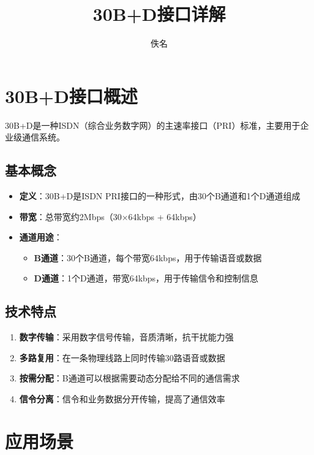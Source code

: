 \documentclass[12pt,UTF8]{ctexbook}
\title{\heiti\zihao{0} 30B+D接口详解}
\author{佚名}
\date{}
\begin{document}
\maketitle
\tableofcontents

\frontmatter

\mainmatter

\chapter{30B+D接口概述}

30B+D是一种ISDN（综合业务数字网）的主速率接口（PRI）标准，主要用于企业级通信系统。

\section{基本概念}

\begin{itemize}
  \item \textbf{定义}：30B+D是ISDN PRI接口的一种形式，由30个B通道和1个D通道组成
  \item \textbf{带宽}：总带宽约2Mbps（30×64kbps + 64kbps）
  \item \textbf{通道用途}：
    \begin{itemize}
      \item \textbf{B通道}：30个B通道，每个带宽64kbps，用于传输语音或数据
      \item \textbf{D通道}：1个D通道，带宽64kbps，用于传输信令和控制信息
    \end{itemize}
\end{itemize}

\section{技术特点}

\begin{enumerate}
  \item \textbf{数字传输}：采用数字信号传输，音质清晰，抗干扰能力强
  \item \textbf{多路复用}：在一条物理线路上同时传输30路语音或数据
  \item \textbf{按需分配}：B通道可以根据需要动态分配给不同的通信需求
  \item \textbf{信令分离}：信令和业务数据分开传输，提高了通信效率
\end{enumerate}

\chapter{应用场景}
\end{document}
